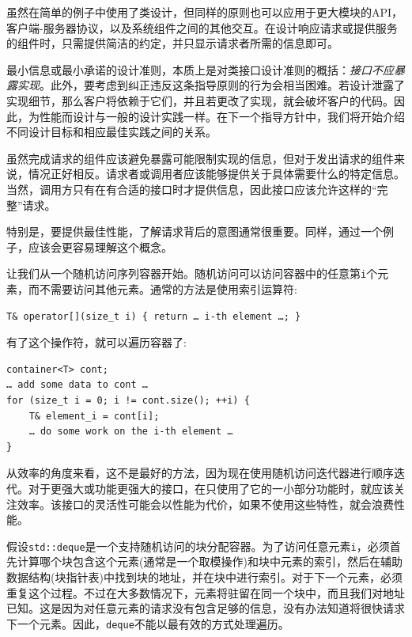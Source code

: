 虽然在简单的例子中使用了类设计，但同样的原则也可以应用于更大模块的API，客户端-服务器协议，以及系统组件之间的其他交互。在设计响应请求或提供服务的组件时，只需提供简洁的约定，并只显示请求者所需的信息即可。

最小信息或最小承诺的设计准则，本质上是对类接口设计准则的概括：\textit{接口不应暴露实现}。此外，要考虑到纠正违反这条指导原则的行为会相当困难。若设计泄露了实现细节，那么客户将依赖于它们，并且若更改了实现，就会破坏客户的代码。因此，为性能而设计与一般的设计实践一样。在下一个指导方针中，我们将开始介绍不同设计目标和相应最佳实践之间的关系。


虽然完成请求的组件应该避免暴露可能限制实现的信息，但对于发出请求的组件来说，情况正好相反。请求者或调用者应该能够提供关于具体需要什么的特定信息。当然，调用方只有在有合适的接口时才提供信息，因此接口应该允许这样的“完整”请求。

特别是，要提供最佳性能，了解请求背后的意图通常很重要。同样，通过一个例子，应该会更容易理解这个概念。
 
让我们从一个随机访问序列容器开始。随机访问可以访问容器中的任意第\texttt{i}个元素，而不需要访问其他元素。通常的方法是使用索引运算符:

\begin{lstlisting}[style=styleCXX]
T& operator[](size_t i) { return … i-th element …; }
\end{lstlisting}

有了这个操作符，就可以遍历容器了:

\begin{lstlisting}[style=styleCXX]
container<T> cont;
… add some data to cont …
for (size_t i = 0; i != cont.size(); ++i) {
	T& element_i = cont[i];
	… do some work on the i-th element …
}
\end{lstlisting}

从效率的角度来看，这不是最好的方法，因为现在使用随机访问迭代器进行顺序迭代。对于更强大或功能更强大的接口，在只使用了它的一小部分功能时，就应该关注效率。该接口的灵活性可能会以性能为代价，如果不使用这些特性，就会浪费性能。 

假设\texttt{std::deque}是一个支持随机访问的块分配容器。为了访问任意元素\texttt{i}，必须首先计算哪个块包含这个元素(通常是一个取模操作)和块中元素的索引，然后在辅助数据结构(块指针表)中找到块的地址，并在块中进行索引。对于下一个元素，必须重复这个过程。不过在大多数情况下，元素将驻留在同一个块中，而且我们对地址已知。这是因为对任意元素的请求没有包含足够的信息，没有办法知道将很快请求下一个元素。因此，\texttt{deque}不能以最有效的方式处理遍历。

